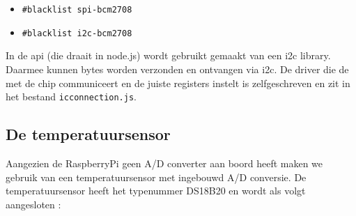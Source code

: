 \documentclass[a4paper,12pt]{article}
\begin{document}
\begin{itemize}
\item \texttt{\#blacklist spi-bcm2708}
\item \texttt{\#blacklist i2c-bcm2708}
\end{itemize}
\noindent
In de api (die draait in node.js) wordt gebruikt gemaakt van een i2c library. Daarmee kunnen bytes worden verzonden en ontvangen via i2c. De driver die de met de chip communiceert en de juiste registers instelt is zelfgeschreven en zit in het bestand \texttt{icconnection.js}.

\subsection{De temperatuursensor}

Aangezien de RaspberryPi geen A/D converter aan boord heeft maken we gebruik van een temperatuursensor met ingebouwd A/D conversie. De temperatuursensor heeft het typenummer DS18B20 en wordt als volgt aangesloten :
\end{document}
